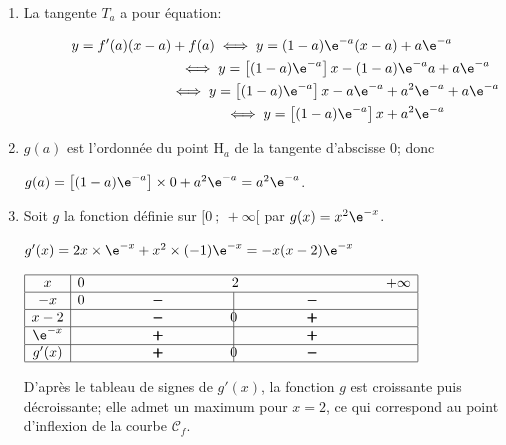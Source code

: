 \begin{enumerate}
	\begin{enumerate}
		\item 
La tangente $T_a$ a pour équation:

$\begin{gathered}y=f'(a)(x-a)+f(a)
\iff
y= (1-a)\e^{-a}(x-a)+a\e^{-a}\\
\phantom{y=f'(a)(x-a)+f(a)}
\iff
y= \left [(1-a)\e^{-a}\right ]x- (1-a)\e^{-a}a+a\e^{-a}\\
\phantom{y=f'(a)(x-a)+f(a)}
\iff
y= \left [(1-a)\e^{-a}\right ]x -a\e^{-a}+a^2\e^{-a}+a\e^{-a}\\
\phantom{y=f'(a)(x-a)+f(a)}
\iff
y= \left [(1-a)\e^{-a}\right ]x +a^2\e^{-a}\end{gathered}$
		
		\item 
$g(a)$ est l'ordonnée	du point H$_a$ de la tangente d'abscisse 0;
donc 

$g(a)= \left [(1-a)\e^{-a}\right ]\times 0 +a^2\e^{-a}=a^2\e^{-a}$.
		
		\item 
Soit $g$ la fonction définie sur $[0~;~ +\infty[$ par $g(x)=x^2\e^{-x}$.

$g'(x)=2x\times \e^{-x}+ x^2\times (-1)\e^{-x}= -x(x-2)\e^{-x}$

\begin{center}
{\renewcommand{\arraystretch}{1.5}
\def\esp{\hspace*{3cm}}
$\begin{array}{|c | *{5}{c} |} 
\hline
x  & 0 & \esp & 2 & \esp  & +\infty \\
\hline
-x &  0 & \pmb{-} &  \vline\hspace{-2.7pt}{\phantom 0} & \pmb{-} &   \\
\hline
x-2 &  & \pmb{-} &  \vline\hspace{-2.7pt}{0} & \pmb{+} &   \\
\hline
\e^{-x} &  & \pmb{+} &  \vline\hspace{-2.7pt}{\phantom 0} & \pmb{+} &   \\
\hline
g'(x) &  & \pmb{+} &  \vline\hspace{-2.7pt}{0} & \pmb{-} &   \\
\hline
\end{array}$
}
\end{center}

D'après le tableau de signes de $g'(x)$, la fonction $g$ est croissante puis décroissante; elle admet un maximum pour $x=2$, ce qui correspond au point d'inflexion de la courbe $\mathcal{C}_f$.


	\end{enumerate}
\end{enumerate}

\bigskip
